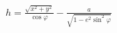 \documentclass{standalone}
\begin{document}
    $h = \frac{\sqrt{x^2+y^2}}{\cos \varphi} - \frac{a}{\sqrt{1 - e^2 {\sin^2 \varphi}}}$
\end{document}
